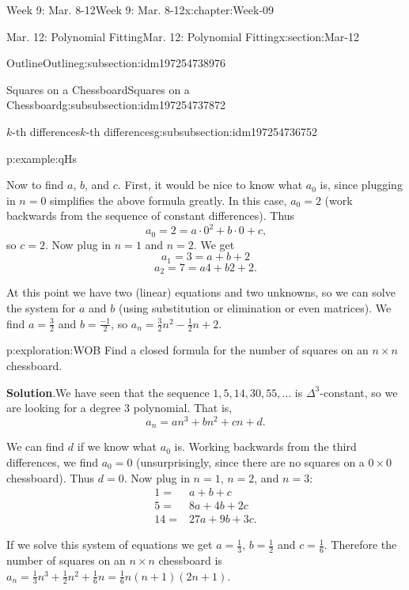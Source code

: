 \documentclass[oneside,10pt,]{book}
\newcommand{\blocktitlefont}{\relax}
\numberwithin{equation}{section}
\newcommand{\amp}{&}
\begin{document}
\begin{chapterptx}{Week 9: Mar. 8-12}{}{Week 9: Mar. 8-12}{}{}{x:chapter:Week-09}
\begin{sectionptx}{Mar. 12: Polynomial Fitting}{}{Mar. 12: Polynomial Fitting}{}{}{x:section:Mar-12}
\begin{subsectionptx}{Outline}{}{Outline}{}{}{g:subsection:idm197254738976}
\begin{subsubsectionptx}{Squares on a Chessboard}{}{Squares on a Chessboard}{}{}{g:subsubsection:idm197254737872}
\begin{subsubsectionptx}{\(k\)-th differences}{}{\(k\)-th differences}{}{}{g:subsubsection:idm197254736752}
\begin{example}{}{p:example:qHs}
\begin{equation*}
\end{equation*}
%
\par
Now to find \(a\), \(b\), and \(c\). First, it would be nice to know what \(a_0\) is, since plugging in \(n = 0\) simplifies the above formula greatly. In this case, \(a_0 = 2\) (work backwards from the sequence of constant differences). Thus%
\begin{equation*}
a_0 = 2 = a\cdot 0^2 + b \cdot 0 + c\text{,}
\end{equation*}
so \(c = 2\). Now plug in \(n =1\) and \(n = 2\). We get%
\begin{equation*}
a_1 = 3 = a + b + 2
\end{equation*}
%
\begin{equation*}
a_2 = 7 = a4 + b 2 + 2\text{.}
\end{equation*}
%
\par
At this point we have two (linear) equations and two unknowns, so we can solve the system for \(a\) and \(b\) (using substitution or elimination or even matrices). We find \(a = \frac{3}{2}\) and \(b = \frac{-1}{2}\), so \(a_n = \frac{3}{2} n^2 - \frac{1}{2}n + 2\).%
\end{example}
\begin{exploration}{}{p:exploration:WOB}%
Find a closed formula for the number of squares on an \(n \times n\) chessboard.%
\par\smallskip%
\noindent\textbf{\blocktitlefont Solution}.\hypertarget{p:solution:HFD}{}\quad{}We have seen that the sequence \(1, 5, 14, 30, 55, \ldots\) is \(\Delta^3\)-constant, so we are looking for a degree 3 polynomial. That is,%
\begin{equation*}
a_n = an^3 + bn^2 + cn + d\text{.}
\end{equation*}
%
\par
We can find \(d\) if we know what \(a_0\) is. Working backwards from the third differences, we find \(a_0 = 0\) (unsurprisingly, since there are no squares on a \(0\times 0\) chessboard). Thus \(d = 0\). Now plug in \(n = 1\), \(n =2\), and \(n =3\):%
\begin{align*}
1 = \amp a + b + c\\
5 = \amp 8a + 4b + 2c\\
14 = \amp 27a + 9b + 3c\text{.}
\end{align*}
%
\par
If we solve this system of equations we get \(a = \frac{1}{3}\), \(b = \frac{1}{2}\) and \(c = \frac{1}{6}\). Therefore the number of squares on an \(n \times n\) chessboard is \(a_n = \frac{1}{3}n^3 + \frac{1}{2}n^2 + \frac{1}{6}n = \frac{1}{6}n(n+1)(2n+1)\).%

\end{exploration}
\end{subsubsectionptx}
\end{subsubsectionptx}
\end{subsectionptx}
\end{sectionptx}
\end{chapterptx}
\end{document}
